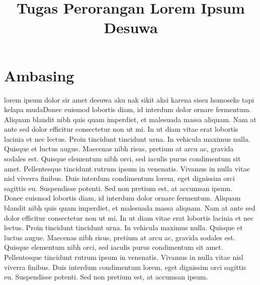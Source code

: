 \documentclass[a4paper, 12pt]{article}
\title{\textbf{Tugas Perorangan}\linebreak 
\textbf{Lorem Ipsum Desuwa}\linebreak}
\date{}
\begin{document}


\section{Ambasing}
lorem ipsum dolor sir amet desuwa aku nak sikit aksi karena sissu homoseks tapi kelapa mudaDonec euismod lobortis diam, id interdum dolor ornare fermentum. Aliquam blandit nibh quis quam imperdiet, et malesuada massa aliquam. Nam at ante sed dolor efficitur consectetur non ut mi. In ut diam vitae erat lobortis lacinia et nec lectus. Proin tincidunt tincidunt urna. In vehicula maximus nulla. Quisque et luctus augue. Maecenas nibh risus, pretium at arcu ac, gravida sodales est. Quisque elementum nibh orci, sed iaculis purus condimentum sit amet. Pellentesque tincidunt rutrum ipsum in venenatis. Vivamus in nulla vitae nisl viverra finibus. Duis interdum condimentum lorem, eget dignissim orci sagittis eu. Suspendisse potenti. Sed non pretium est, at accumsan ipsum. \\
\newline
\newline
Donec euismod lobortis diam, id interdum dolor ornare fermentum. Aliquam blandit nibh quis quam imperdiet, et malesuada massa aliquam. Nam at ante sed dolor efficitur consectetur non ut mi. In ut diam vitae erat lobortis lacinia et nec lectus. Proin tincidunt tincidunt urna. In vehicula maximus nulla. Quisque et luctus augue. Maecenas nibh risus, pretium at arcu ac, gravida sodales est. Quisque elementum nibh orci, sed iaculis purus condimentum sit amet. Pellentesque tincidunt rutrum ipsum in venenatis. Vivamus in nulla vitae nisl viverra finibus. Duis interdum condimentum lorem, eget dignissim orci sagittis eu. Suspendisse potenti. Sed non pretium est, at accumsan ipsum.
\end{document}
